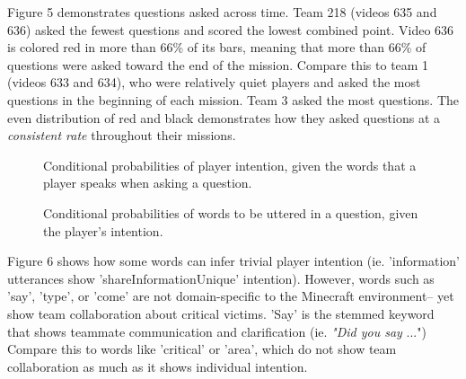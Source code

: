 Figure 5 demonstrates questions asked across time. Team 218 (videos 635 and 636) asked the fewest questions and scored the lowest combined point. Video 636 is colored red in more than 66\% of its bars, meaning that more than 66\% of questions were asked toward the end of the mission. Compare this to team 1 (videos 633 and 634), who were relatively quiet players and asked the most questions in the beginning of each mission. Team 3 asked the most questions. The even distribution of red and black demonstrates how they asked questions at a \emph{consistent rate} throughout their missions.


\begin{figure}[h!]
    \centering
    \caption{Conditional probabilities of player intention, given the words that a player speaks when asking a question.}
    \end{figure}
    
\begin{figure}[h!]
    \centering
    \caption{Conditional probabilities of words to be uttered in a question, given the player's intention.}
    \end{figure}
    Figure 6 shows how some words can infer trivial player intention (ie. 'information' utterances show 'shareInformationUnique' intention). However, words such as 'say', 'type', or 'come' are not domain-specific to the Minecraft environment-- yet show team collaboration about critical victims. 'Say' is the stemmed keyword that shows teammate communication and clarification (ie. \emph{"Did you say} ...") Compare this to words like 'critical' or 'area', which do not show team collaboration as much as it shows individual intention.  
    
